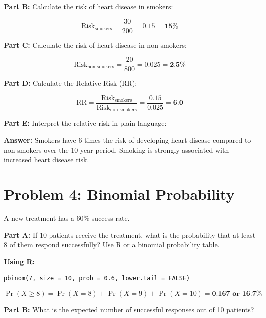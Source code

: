 \documentclass[11pt]{article}
\begin{document}
\vspace{12pt}

\textbf{Part B:} Calculate the risk of heart disease in smokers:

$$\text{Risk}_{\text{smokers}} = \frac{30}{200} = 0.15 = \textbf{15\%}$$

\vspace{6pt}

\textbf{Part C:} Calculate the risk of heart disease in non-smokers:

$$\text{Risk}_{\text{non-smokers}} = \frac{20}{800} = 0.025 = \textbf{2.5\%}$$

\vspace{6pt}

\textbf{Part D:} Calculate the Relative Risk (RR):

$$\text{RR} = \frac{\text{Risk}_{\text{smokers}}}{\text{Risk}_{\text{non-smokers}}} = \frac{0.15}{0.025} = \textbf{6.0}$$

\vspace{6pt}

\textbf{Part E:} Interpret the relative risk in plain language:

\textbf{Answer:} Smokers have 6 times the risk of developing heart disease compared to non-smokers over the 10-year period. Smoking is strongly associated with increased heart disease risk.

\section{Problem 4: Binomial Probability}

A new treatment has a 60\% success rate.

\vspace{12pt}

\textbf{Part A:} If 10 patients receive the treatment, what is the probability that at least 8 of them respond successfully? Use R or a binomial probability table.

\textbf{Using R:}
\begin{verbatim}
pbinom(7, size = 10, prob = 0.6, lower.tail = FALSE)
\end{verbatim}

$$\Pr(X \geq 8) = \Pr(X = 8) + \Pr(X = 9) + \Pr(X = 10) = \textbf{0.167 or 16.7\%}$$

\vspace{12pt}

\textbf{Part B:} What is the expected number of successful responses out of 10 patients?
\end{document}
